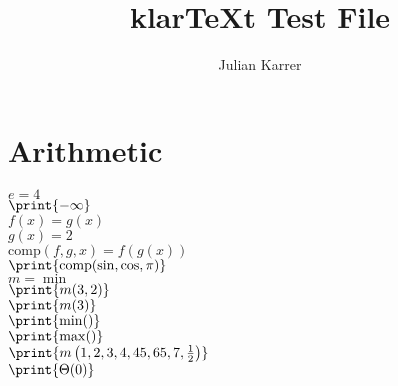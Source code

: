 \documentclass[oneside, a4paper]{article}
\author{Julian Karrer}
\title{klarTeXt Test File}
\begin{document}
\maketitle
\section*{Arithmetic}

\begin{program}

$e = 4$\\
$\print{-\infty}$\\
$f(x) = g(x)$\\
$g(x) = 2$\\
$\text{comp}(f,g,x) = f(g(x))$\\
$\print{\text{comp}(\sin,\cos,\pi)}$\\
$m = \min$\\
$\print{m (3,2)}$\\
$\print{m (3)}$\\
$\print{\min ()}$\\
$\print{\max ()}$\\
$\print{m\left(1,2,3,4,45,65,7,\frac{1}{2}\right)}$\\
$\print{\Theta(0)}$\\


\end{program}
\end{document}
